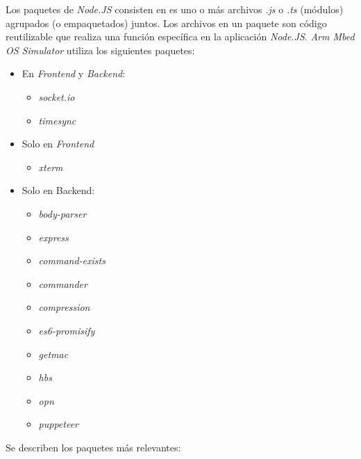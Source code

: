 Los paquetes de \textit{Node.JS} consisten en es uno o más archivos \textit{.js} o \textit{.ts} (módulos) agrupados (o empaquetados) juntos. Los archivos en un paquete son código reutilizable que realiza una función específica en la aplicación \textit{Node.JS}. \textit{Arm Mbed OS Simulator} utiliza los siguientes paquetes:

\begin{itemize}
    \item En \textit{Frontend} y \textit{Backend}:
        \begin{itemize}
    	\item \textit{socket.io}
    	\item \textit{timesync}
        \end{itemize}
    \item Solo en \textit{Frontend}
        \begin{itemize}
            \item \textit{xterm}
        \end{itemize}
    \item Solo en {Backend}:
        \begin{itemize}
            \item \textit{body-parser}
            \item \textit{express}
            \item \textit{command-exists}
            \item \textit{commander}
            \item \textit{compression}
            \item \textit{es6-promisify}
            \item \textit{getmac}
            \item \textit{hbs}
            \item \textit{opn}
            \item \textit{puppeteer}
        \end{itemize}
\end{itemize}

Se describen los paquetes más relevantes:

